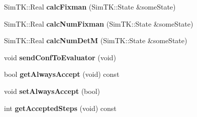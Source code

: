 \begin{DoxyCompactItemize}
\item 
Sim\+T\+K\+::\+Real {\bfseries calc\+Fixman} (Sim\+T\+K\+::\+State \&some\+State)\hypertarget{classMonteCarloSampler_a7865bdccd1f6d03efa08978b2fd943fe}{}\label{classMonteCarloSampler_a7865bdccd1f6d03efa08978b2fd943fe}

\item 
Sim\+T\+K\+::\+Real {\bfseries calc\+Num\+Fixman} (Sim\+T\+K\+::\+State \&some\+State)\hypertarget{classMonteCarloSampler_a9b94172a710aebf05d4ddbb889991f46}{}\label{classMonteCarloSampler_a9b94172a710aebf05d4ddbb889991f46}

\item 
Sim\+T\+K\+::\+Real {\bfseries calc\+Num\+DetM} (Sim\+T\+K\+::\+State \&some\+State)\hypertarget{classMonteCarloSampler_acf6a189a1c0d4c19b51d768341a4efe0}{}\label{classMonteCarloSampler_acf6a189a1c0d4c19b51d768341a4efe0}

\item 
void {\bfseries send\+Conf\+To\+Evaluator} (void)\hypertarget{classMonteCarloSampler_ad82ab3bef1e3fd97c6abf697738792a6}{}\label{classMonteCarloSampler_ad82ab3bef1e3fd97c6abf697738792a6}

\item 
bool {\bfseries get\+Always\+Accept} (void) const \hypertarget{classMonteCarloSampler_a6eab6650da5aab47299128f806228e8f}{}\label{classMonteCarloSampler_a6eab6650da5aab47299128f806228e8f}

\item 
void {\bfseries set\+Always\+Accept} (bool)\hypertarget{classMonteCarloSampler_a93d9574f30822b76ca34ee916c4eb5fa}{}\label{classMonteCarloSampler_a93d9574f30822b76ca34ee916c4eb5fa}

\item 
int {\bfseries get\+Accepted\+Steps} (void) const \hypertarget{classMonteCarloSampler_a2bb387a9068adf5861c7ca63b2c65641}{}\label{classMonteCarloSampler_a2bb387a9068adf5861c7ca63b2c65641}

\end{DoxyCompactItemize}
